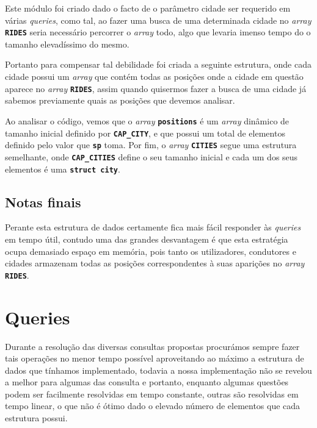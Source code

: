 \documentclass[12pt,a4paper]{report}
\begin{document}
Este módulo foi criado dado o facto de o parâmetro cidade ser requerido em várias \textit{queries}, como tal, ao fazer uma busca de uma determinada cidade no \textit{array} \textbf{\small\texttt{RIDES}} seria necessário percorrer o \textit{array} todo, algo que levaria imenso tempo do o tamanho elevadíssimo do mesmo.

Portanto para compensar tal debilidade foi criada a seguinte estrutura, onde cada cidade possui um \textit{array} que contém todas as posições onde a cidade em questão aparece no \textit{array} \textbf{\small\texttt{RIDES}}, assim quando quisermos fazer a busca de uma cidade já sabemos previamente quais as posições que devemos analisar.



Ao analisar o código, vemos que o \textit{array} \textbf{\small\texttt{positions}} é um \textit{array} dinâmico de tamanho inicial definido por \textbf{\small\texttt{CAP\_CITY}}, e que possui um total de elementos definido pelo valor que \textbf{\small\texttt{sp}} toma. Por fim, o \textit{array} \textbf{\small\texttt{CITIES}}  segue uma estrutura semelhante, onde \textbf{\small\texttt{CAP\_CITIES}} define o seu tamanho inicial e cada um dos seus elementos é uma \textbf{\small\texttt{struct city}}.

\section{Notas finais}

Perante esta estrutura de dados certamente fica mais fácil responder às \textit{queries} em tempo útil, contudo uma das grandes desvantagem é que esta estratégia ocupa demasiado espaço em memória, pois tanto os utilizadores, condutores e cidades armazenam todas as posições correspondentes à suas aparições no \textit{array} \textbf{\small\texttt{RIDES}}.


\chapter{Queries}

Durante a resolução das diversas consultas propostas procurámos sempre fazer tais operações no menor tempo possível aproveitando ao máximo a estrutura de dados que tínhamos implementado, todavia a nossa implementação não se revelou a melhor para algumas das consulta e portanto, enquanto algumas questões podem ser facilmente resolvidas em tempo constante, outras são resolvidas em tempo linear, o que não é ótimo dado o elevado número de elementos que cada estrutura possui.
\end{document}
